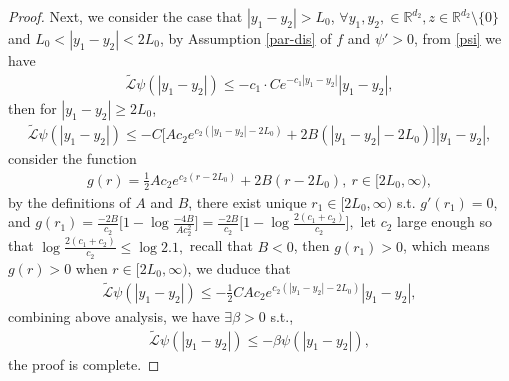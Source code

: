 \documentclass[11pt,reqno]{amsart}
\numberwithin{equation}{section}
\begin{document}
\begin{proof}
Next, we consider the case that $|y_1-y_2|>L_0$, $\forall y_1,y_2,\in\mathbb{R}^{d_2}, z\in\mathbb{R}^{d_2}\setminus \{0\}$ and $L_0<
|y_1-y_2|<2L_0$, by Assumption \ref{par-dis} of $f$ and $\psi'>0$, from \eqref{psi} we have
\begin{align*}
\widetilde{\mathcal{L}}\psi(|y_1-y_2|)\leq-c_1\cdot Ce^{-c_1|y_1-y_2|}|y_1-y_2|,
\end{align*}
then for $|y_1-y_2|\geq2L_0$,
\begin{align*}
\widetilde{\mathcal{L}}\psi(|y_1-y_2|)\leq-C \bigl[Ac_2e^{c_2(|y_1-y_2|-2L_0)}+2B(|y_1-y_2|-2L_0)\bigr]|y_1-y_2|,
\end{align*}
consider the function
\begin{align}\label{r-2l}
g(r)=\frac{1}{2}Ac_2e^{c_2(r-2L_0)}+2B(r-2L_0),\ r\in [2L_0,\infty),
\end{align}
by the definitions of $A$ and
$B$, there exist unique $r_1\in[2L_0,\infty)$ s.t. $g'(r_1)=0$, and 
$
g(r_1)=\frac{-2B}{c_2} \big[1-\log\frac{-4B}{Ac_2^2} \big]=\frac
{-2B}{c_2} \big[1-\log \frac{2(c_1+c_2)}{c_2} \big],
$
let $c_2$ large enough so that $\log \frac{2(c_1+c_2)}{c_2}\le\log2.1,$ recall that $B<0$, then $g(r_1)>0$, which means $g(r)>0$ when $r\in [2L_0,\infty)$, we duduce that 
\begin{align*}
	\widetilde{\mathcal{L}}\psi(|y_1-y_2|)\leq-\frac{1}{2} CAc_2e^{c_2(|y_1-y_2|-2L_0)}|y_1-y_2|,
\end{align*}
combining above analysis, we have $\exists\beta>0$ s.t.,
\begin{align*}
	\widetilde{\mathcal{L}}\psi(|y_1-y_2|)\leq-\beta \psi(|y_1-y_2|),
\end{align*}
the proof is complete.
\end{proof}


\end{document}
